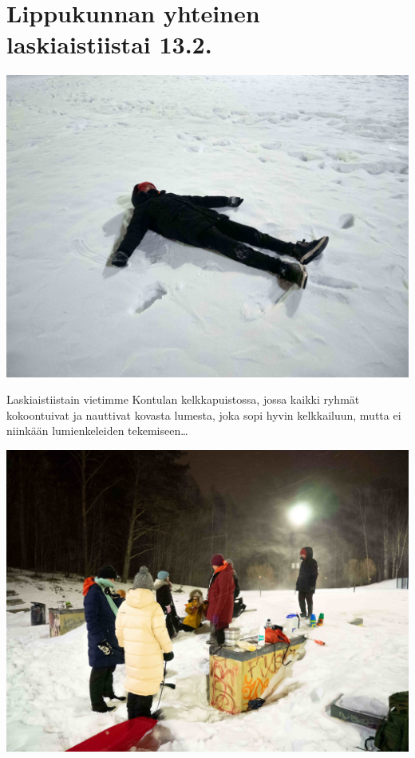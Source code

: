 
\section{Lippukunnan yhteinen laskiaistiistai 13.2.}

\begin{multicols}{2}

	\vspace*{0.16cm}
	\noindent\includegraphics[width=\linewidth]{assets/laskiaistiistai2}

	\small\noindent Laskiaistiistain vietimme Kontulan \mbox{kelkkapuistossa}, jossa kaikki
	ryhmät kokoontuivat ja nauttivat kovasta lumesta, joka sopi hyvin kelkkailuun, mutta ei niinkään
	lumienkeleiden tekemiseen\ldots

	\vspace*{1.28cm}
	\noindent\includegraphics[width=\linewidth]{assets/laskiaistiistai1}


\end{multicols}
